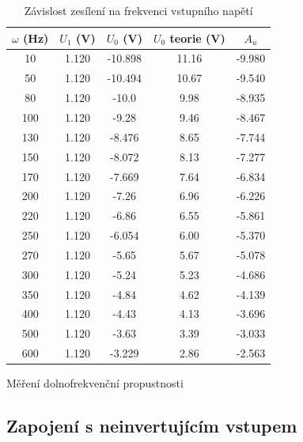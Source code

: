 \documentclass[a4paper,11pt]{article}
\begin{document}
\begin{table}[h]
    \begin{minipage}{.5\linewidth}
        \centering
        \begin{tabular}{| c c c c c |}
            \hline
            $ \omega $ (Hz) & $ U_1 $ (V)  & $ U_0 $  (V) & $ U_0 $ teorie (V) & $ A_u $  \\
            \hline    
            10  & 1.120 &  -10.898  &  11.16 & -9.980 \\
            50  & 1.120 &  -10.494  &  10.67 & -9.540 \\
            80  & 1.120 &  -10.0    &  9.98  & -8.935 \\
            100 & 1.120 &  -9.28    &  9.46  & -8.467 \\
            130 & 1.120 &  -8.476   &  8.65  & -7.744 \\
            150 & 1.120 &  -8.072   &  8.13  & -7.277 \\
            170 & 1.120 &  -7.669   &  7.64  & -6.834 \\
            200 & 1.120 &  -7.26    &  6.96  & -6.226 \\
            220 & 1.120 &  -6.86    &  6.55  & -5.861 \\
            250 & 1.120 &  -6.054   &  6.00  & -5.370 \\
            270 & 1.120 &  -5.65    &  5.67  & -5.078 \\
            300 & 1.120 &  -5.24    &  5.23  & -4.686 \\
            350 & 1.120 &  -4.84    &  4.62  & -4.139 \\
            400 & 1.120 &  -4.43    &  4.13  & -3.696 \\
            500 & 1.120 &  -3.63    &  3.39  & -3.033 \\
            600 & 1.120 &  -3.229   &  2.86  & -2.563 \\
            \hline
        \end{tabular}
        \caption{Měření dolnofrekvenční propustnosti}
    \end{minipage} 
    \hfill
    \begin{minipage}{.45\linewidth}
        \centering
        \resizebox{\textwidth}{!}{  }
        \captionsetup{type=graph}
        \caption{Závislost zesílení na frekvenci vstupního napětí}
    \end{minipage} 
\end{table}

\subsection{Zapojení s neinvertujícím vstupem}
\end{document}
